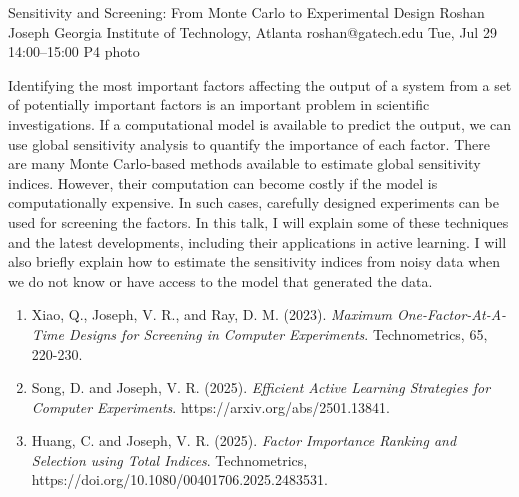 \clearpage
\begin{talk}
  {Sensitivity and Screening: From Monte Carlo to Experimental Design}%
  {Roshan Joseph}%
  {Georgia Institute of Technology, Atlanta}%
  {roshan@gatech.edu}%
  {}%
  {}%
  {Tue, Jul 29 14:00--15:00}%
  {P4}%
  {photo}%
  
    
   
Identifying the most important factors affecting the output of a system from a set of potentially important factors is an important problem in scientific investigations. If a computational model is available to predict the output, we can use global sensitivity analysis to quantify the importance of each factor. There are many Monte Carlo-based methods available to estimate global sensitivity indices. However, their computation can become costly if the model is computationally expensive. In such cases, carefully designed experiments can be used for screening the factors. In this talk, I will explain some of these techniques and the latest developments, including their applications in active learning. I will also briefly explain how to estimate the sensitivity indices from noisy data when we do not know or have access to the model that generated the data.
\medskip

\begin{enumerate}
 \item[{[1]}] Xiao, Q., Joseph, V. R., and Ray, D. M. (2023). {\it Maximum One-Factor-At-A-Time  Designs for Screening in Computer Experiments}. Technometrics, 65, 220-230.
    \item[{[2]}] Song, D. and Joseph, V. R. (2025). {\it Efficient Active Learning Strategies for Computer Experiments}. https://arxiv.org/abs/2501.13841.
 \item[{[3]}] Huang, C. and Joseph, V. R. (2025). {\it Factor Importance Ranking and Selection using Total Indices}. Technometrics, https://doi.org/10.1080/00401706.2025.2483531.
\end{enumerate}

\end{talk}

